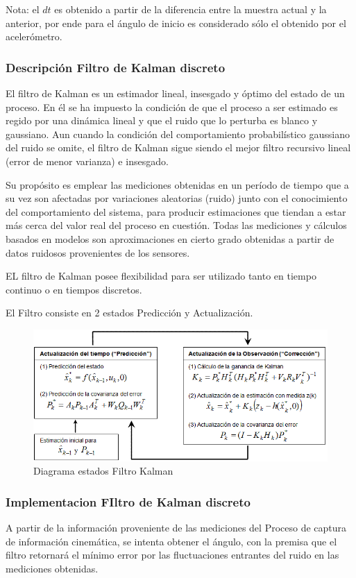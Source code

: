 \documentclass[12pt,a4paper]{article}
\begin{document}
Nota: el $dt$ es obtenido a partir de la diferencia entre la muestra actual y la anterior, por ende para el ángulo de inicio es considerado sólo el obtenido por el acelerómetro.

\subsubsection{Descripción Filtro de Kalman discreto}
El filtro de Kalman es un estimador lineal, insesgado y óptimo del estado de un proceso. En él se ha impuesto la condición de que el proceso a ser estimado es regido por una dinámica lineal y que el ruido que lo perturba es blanco y gaussiano. Aun cuando la condición del comportamiento probabilístico gaussiano del ruido se omite, el filtro de Kalman sigue siendo el mejor filtro recursivo lineal (error de menor varianza) e insesgado\cite{TesisUSM}.

Su propósito es emplear las mediciones obtenidas en un período de tiempo que a su vez son afectadas por variaciones  aleatorias (ruido) junto con el conocimiento del comportamiento del sistema, para producir estimaciones que tiendan a estar más cerca del valor real del proceso en cuestión. Todas las mediciones y cálculos basados en modelos son aproximaciones en cierto grado obtenidas a partir de datos ruidosos provenientes de los sensores.

EL filtro de Kalman posee flexibilidad para ser utilizado tanto en tiempo continuo o en tiempos discretos.

El Filtro consiste en 2 estados Predicción y Actualización.

\begin{figure}[H]
	\centering
	\includegraphics[scale=0.65]{images/kalman-filter.png} 
	\caption{Diagrama estados Filtro Kalman}
	\label{fig:diagramakalman}
\end{figure}

\subsubsection{Implementacion FIltro de Kalman discreto}
A partir de la información proveniente de las mediciones del Proceso de captura de información cinemática, se intenta obtener el ángulo, con la premisa que el filtro retornará el mínimo error por las fluctuaciones entrantes del ruido en las mediciones obtenidas.
\end{document}
